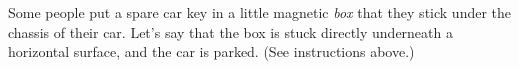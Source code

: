 Some people put a spare car key in a little magnetic
\emph{box} that they stick under the chassis of their car.
Let's say that the box is stuck directly underneath a horizontal
surface, and the car is parked.
(See instructions above.)
